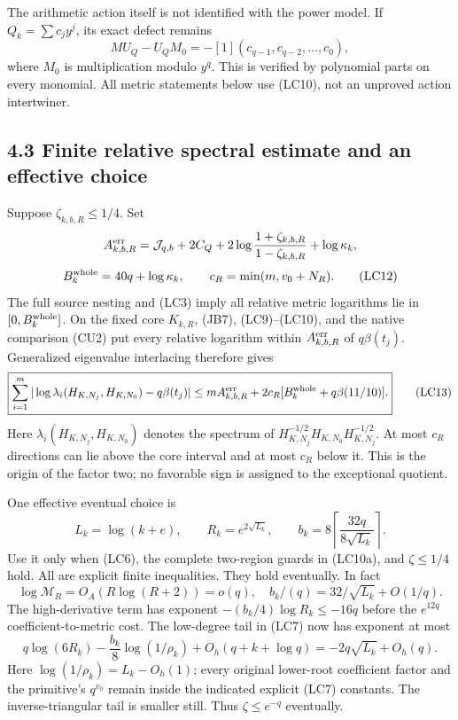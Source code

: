 \documentclass[10pt]{article}
\begin{document}
The arithmetic action itself is not identified with the power model. If \(Q_k=\sum c_jy^j\), its exact defect remains \[
 \boxed{MU_Q-U_QM_0
 =-[1](c_{q-1},c_{q-2},\ldots,c_0),}
 \tag{LC11}
\] where \(M_0\) is multiplication modulo \(y^q\). This is verified by polynomial parts on every monomial. All metric statements below use (LC10), not an unproved action intertwiner.

\subsection{4.3 Finite relative spectral estimate and an effective choice}\label{finite-relative-spectral-estimate-and-an-effective-choice}

Suppose \(\zeta_{k,b,R}\le1/4\). Set \[
 A_{k,b,R}^{\rm err}
 =\mathcal J_{q,b}+2C_Q
 +2\log\frac{1+\zeta_{k,b,R}}{1-\zeta_{k,b,R}}
 +\log\kappa_k,
\] \[
 B_k^{\rm whole}=40q+\log\kappa_k,
 \qquad c_R=\min(m,v_0+N_R).
 \tag{LC12}
\] The full source nesting and (LC3) imply all relative metric logarithms lie in \([0,B_k^{\rm whole}]\). On the fixed core \(K_{k,R}\), (JB7), (LC9)--(LC10), and the native comparison (CU2) put every relative logarithm within \(A_{k,b,R}^{\rm err}\) of \(q\beta(t_j)\). Generalized eigenvalue interlacing therefore gives \[
 \boxed{\sum_{i=1}^{m}
 |\log\lambda_i(H_{K,N_j},H_{K,N_0})-q\beta(t_j)|
 \le mA_{k,b,R}^{\rm err}
 +2c_R[B_k^{\rm whole}+q\beta(11/10)].}
 \tag{LC13}
\] Here \(\lambda_i(H_{K,N_j},H_{K,N_0})\) denotes the spectrum of \(H_{K,N_j}^{-1/2}H_{K,N_0}H_{K,N_j}^{-1/2}\). At most \(c_R\) directions can lie above the core interval and at most \(c_R\) below it. This is the origin of the factor two; no favorable sign is assigned to the exceptional quotient.

One effective eventual choice is \[
 L_k=\log(k+e),\qquad
 R_k=e^{2\sqrt{L_k}},\qquad
 b_k=8\left\lceil\frac{32q}{8\sqrt{L_k}}\right\rceil.
 \tag{LC14}
\] Use it only when (LC6), the complete two-region guards in (LC10a), and \(\zeta\le1/4\) hold. All are explicit finite inequalities. They hold eventually. In fact \[
 \log\mathcal M_R=O_A(R\log(R+2))=o(q),\quad
 b_k/(q)=32/\sqrt{L_k}+O(1/q).
\] The high-derivative term has exponent \(-(b_k/4)\log R_k\le-16q\) before the \(e^{12q}\) coefficient-to-metric cost. The low-degree tail in (LC7) now has exponent at most \[
 q\log(6R_k)-\frac{b_k}{8}\log(1/\rho_k)+O_h(q+k+\log q)
 =-2q\sqrt{L_k}+O_h(q).
\] Here \(\log(1/\rho_k)=L_k-O_h(1)\); every original lower-root coefficient factor and the primitive's \(q^{v_0}\) remain inside the indicated explicit (LC7) constants. The inverse-triangular tail is smaller still. Thus \(\zeta\le e^{-q}\) eventually.
\end{document}
